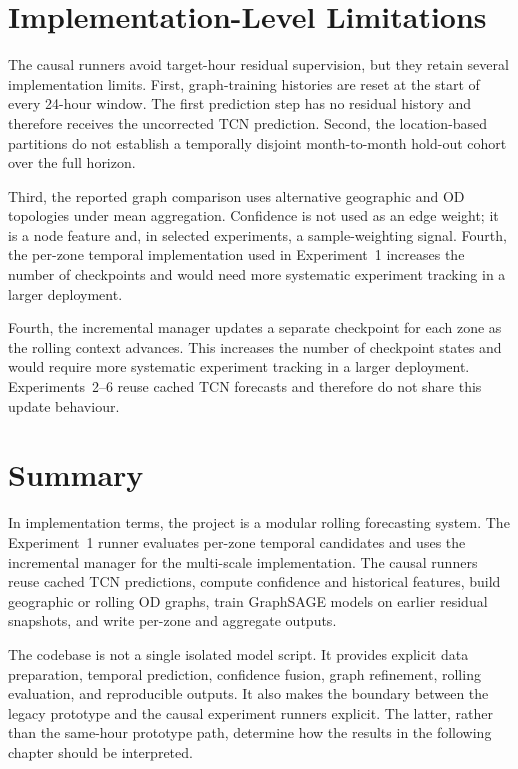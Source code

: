 \documentclass[12pt,a4paper]{report}
\begin{document}
\section{Implementation-Level Limitations}

The causal runners avoid target-hour residual supervision, but they retain several implementation limits. First, graph-training histories are reset at the start of every 24-hour window. The first prediction step has no residual history and therefore receives the uncorrected TCN prediction. Second, the location-based partitions do not establish a temporally disjoint month-to-month hold-out cohort over the full horizon.

Third, the reported graph comparison uses alternative geographic and OD topologies under mean aggregation. Confidence is not used as an edge weight; it is a node feature and, in selected experiments, a sample-weighting signal. Fourth, the per-zone temporal implementation used in Experiment~1 increases the number of checkpoints and would need more systematic experiment tracking in a larger deployment.
	
	Fourth, the incremental manager updates a separate checkpoint for each zone as the rolling context advances. This increases the number of checkpoint states and would require more systematic experiment tracking in a larger deployment. Experiments~2--6 reuse cached TCN forecasts and therefore do not share this update behaviour.
	
	\section{Summary}
	
In implementation terms, the project is a modular rolling forecasting system. The Experiment~1 runner evaluates per-zone temporal candidates and uses the incremental manager for the multi-scale implementation. The causal runners reuse cached TCN predictions, compute confidence and historical features, build geographic or rolling OD graphs, train GraphSAGE models on earlier residual snapshots, and write per-zone and aggregate outputs.
	
The codebase is not a single isolated model script. It provides explicit data preparation, temporal prediction, confidence fusion, graph refinement, rolling evaluation, and reproducible outputs. It also makes the boundary between the legacy prototype and the causal experiment runners explicit. The latter, rather than the same-hour prototype path, determine how the results in the following chapter should be interpreted.
	
\end{document}
